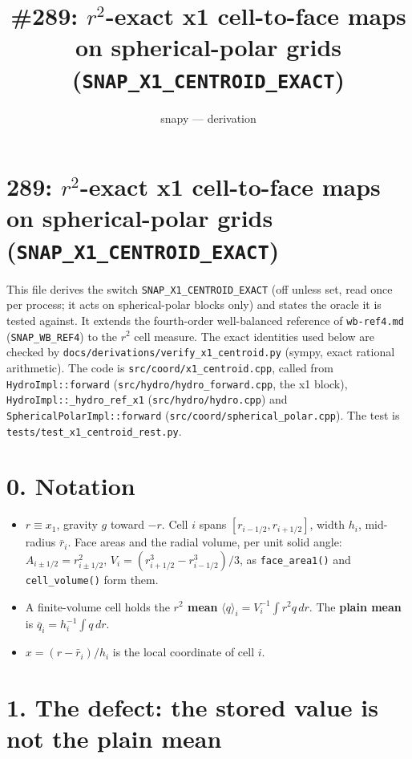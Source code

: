 \documentclass[11pt,a4paper]{article}
\title{\#289: $r^2$-exact x1 cell-to-face maps on spherical-polar grids (\texttt{SNAP\_X1\_CENTROID\_EXACT})}
\author{snapy --- derivation}\date{}
\begin{document}
\maketitle
\section*{289: $r^2$-exact x1 cell-to-face maps on spherical-polar grids (\texttt{SNAP\_X1\_CENTROID\_EXACT})}

This file derives the switch \texttt{SNAP\_X1\_CENTROID\_EXACT} (off unless set, read once per process; it acts on
spherical-polar blocks only) and states the oracle it is tested against. It extends the fourth-order
well-balanced reference of \texttt{wb-ref4.md} (\texttt{SNAP\_WB\_REF4}) to the $r^2$ cell measure. The exact identities used
below are checked by \texttt{docs/derivations/verify\_x1\_centroid.py} (sympy, exact rational arithmetic). The code is
\texttt{src/coord/x1\_centroid.cpp}, called from \texttt{HydroImpl::forward} (\texttt{src/hydro/hydro\_forward.cpp}, the x1 block),
\texttt{HydroImpl::\_hydro\_ref\_x1} (\texttt{src/hydro/hydro.cpp}) and \texttt{SphericalPolarImpl::forward}
(\texttt{src/coord/spherical\_polar.cpp}). The test is \texttt{tests/test\_x1\_centroid\_rest.py}.

\section*{0. Notation}

\begin{itemize}
\item $r \equiv x_1$, gravity $g$ toward $-r$. Cell $i$ spans $[r_{i-1/2}, r_{i+1/2}]$, width $h_i$, mid-radius
  $\bar r_i$. Face areas and the radial volume, per unit solid angle: $A_{i\pm1/2} = r_{i\pm1/2}^2$,
  $V_i = (r_{i+1/2}^3 - r_{i-1/2}^3)/3$, as \texttt{face\_area1()} and \texttt{cell\_volume()} form them.
\item A finite-volume cell holds the \textbf{$r^2$ mean} $\langle q\rangle_i = V_i^{-1}\int r^2 q\,dr$. The \textbf{plain mean}
  is $\overline{q}_i = h_i^{-1}\int q\,dr$.
\item $x = (r - \bar r_i)/h_i$ is the local coordinate of cell $i$.
\end{itemize}

\section*{1. The defect: the stored value is not the plain mean}
\end{document}
